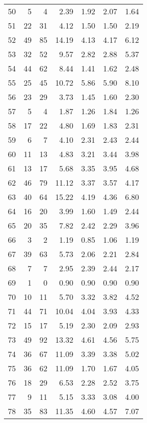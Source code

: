 \begin{longtable}{rrrrrrr}
   50 &   5 &   4 & 2.39 & 1.92 & 2.07 & 1.64 \\ 
   51 &  22 &  31 & 4.12 & 1.50 & 1.50 & 2.19 \\ 
   52 &  49 &  85 & 14.19 & 4.13 & 4.17 & 6.12 \\ 
   53 &  32 &  52 & 9.57 & 2.82 & 2.88 & 5.37 \\ 
   54 &  44 &  62 & 8.44 & 1.41 & 1.62 & 2.48 \\ 
   55 &  25 &  45 & 10.72 & 5.86 & 5.90 & 8.10 \\ 
   56 &  23 &  29 & 3.73 & 1.45 & 1.60 & 2.30 \\ 
   57 &   5 &   4 & 1.87 & 1.26 & 1.84 & 1.26 \\ 
   58 &  17 &  22 & 4.80 & 1.69 & 1.83 & 2.31 \\ 
   59 &   6 &   7 & 4.10 & 2.31 & 2.43 & 2.44 \\ 
   60 &  11 &  13 & 4.83 & 3.21 & 3.44 & 3.98 \\ 
   61 &  13 &  17 & 5.68 & 3.35 & 3.95 & 4.68 \\ 
   62 &  46 &  79 & 11.12 & 3.37 & 3.57 & 4.17 \\ 
   63 &  40 &  64 & 15.22 & 4.19 & 4.36 & 6.80 \\ 
   64 &  16 &  20 & 3.99 & 1.60 & 1.49 & 2.44 \\ 
   65 &  20 &  35 & 7.82 & 2.42 & 2.29 & 3.96 \\ 
   66 &   3 &   2 & 1.19 & 0.85 & 1.06 & 1.19 \\ 
   67 &  39 &  63 & 5.73 & 2.06 & 2.21 & 2.84 \\ 
   68 &   7 &   7 & 2.95 & 2.39 & 2.44 & 2.17 \\ 
   69 &   1 &   0 & 0.90 & 0.90 & 0.90 & 0.90 \\ 
   70 &  10 &  11 & 5.70 & 3.32 & 3.82 & 4.52 \\ 
   71 &  44 &  71 & 10.04 & 4.04 & 3.93 & 4.33 \\ 
   72 &  15 &  17 & 5.19 & 2.30 & 2.09 & 2.93 \\ 
   73 &  49 &  92 & 13.32 & 4.61 & 4.56 & 5.75 \\ 
   74 &  36 &  67 & 11.09 & 3.39 & 3.38 & 5.02 \\ 
   75 &  36 &  62 & 11.09 & 1.70 & 1.67 & 4.05 \\ 
   76 &  18 &  29 & 6.53 & 2.28 & 2.52 & 3.75 \\ 
   77 &   9 &  11 & 5.15 & 3.33 & 3.08 & 4.00 \\ 
   78 &  35 &  83 & 11.35 & 4.60 & 4.57 & 7.07 \\ 

\end{longtable}
